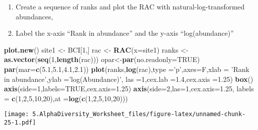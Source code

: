 \documentclass[
]{article}
\newenvironment{Shaded}{\begin{snugshade}}{\end{snugshade}}
\newcommand{\DataTypeTok}[1]{\textcolor[rgb]{0.13,0.29,0.53}{#1}}
\newcommand{\DecValTok}[1]{\textcolor[rgb]{0.00,0.00,0.81}{#1}}
\newcommand{\FloatTok}[1]{\textcolor[rgb]{0.00,0.00,0.81}{#1}}
\newcommand{\KeywordTok}[1]{\textcolor[rgb]{0.13,0.29,0.53}{\textbf{#1}}}
\newcommand{\NormalTok}[1]{#1}
\newcommand{\OtherTok}[1]{\textcolor[rgb]{0.56,0.35,0.01}{#1}}
\newcommand{\StringTok}[1]{\textcolor[rgb]{0.31,0.60,0.02}{#1}}
\begin{document}
\begin{enumerate}
\def\labelenumi{\arabic{enumi}.}
\item
  Create a sequence of ranks and plot the RAC with
  natural-log-transformed abundances,
\item
  Label the x-axis ``Rank in abundance'' and the y-axis
  ``log(abundance)''
\end{enumerate}

\begin{Shaded}
\begin{Highlighting}[]
\KeywordTok{plot.new}\NormalTok{()}
\NormalTok{site1 <-}\StringTok{ }\NormalTok{BCI[}\DecValTok{1}\NormalTok{,]}
\NormalTok{rac <-}\StringTok{ }\KeywordTok{RAC}\NormalTok{(}\DataTypeTok{x=}\NormalTok{site1)}
\NormalTok{ranks <-}\StringTok{ }\KeywordTok{as.vector}\NormalTok{(}\KeywordTok{seq}\NormalTok{(}\DecValTok{1}\NormalTok{,}\KeywordTok{length}\NormalTok{(rac)))}
\NormalTok{opar<-}\KeywordTok{par}\NormalTok{(}\DataTypeTok{no.readonly=}\OtherTok{TRUE}\NormalTok{)}
\KeywordTok{par}\NormalTok{(}\DataTypeTok{mar=}\KeywordTok{c}\NormalTok{(}\FloatTok{5.1}\NormalTok{,}\FloatTok{5.1}\NormalTok{,}\FloatTok{4.1}\NormalTok{,}\FloatTok{2.1}\NormalTok{))}
\KeywordTok{plot}\NormalTok{(ranks,}\KeywordTok{log}\NormalTok{(rac),}\DataTypeTok{type =}\StringTok{'p'}\NormalTok{,}\DataTypeTok{axes=}\NormalTok{F,}\DataTypeTok{xlab =} \StringTok{'Rank in abundance'}\NormalTok{,}\DataTypeTok{ylab =}\StringTok{'log(Abundance)'}\NormalTok{,}
     \DataTypeTok{las =}\DecValTok{1}\NormalTok{,}\DataTypeTok{cex.lab =}\FloatTok{1.4}\NormalTok{,}\DataTypeTok{cex.axis =}\FloatTok{1.25}\NormalTok{)}
\KeywordTok{box}\NormalTok{()}
\KeywordTok{axis}\NormalTok{(}\DataTypeTok{side=}\DecValTok{1}\NormalTok{,}\DataTypeTok{labels=}\OtherTok{TRUE}\NormalTok{,}\DataTypeTok{cex.axis=}\FloatTok{1.25}\NormalTok{)}
\KeywordTok{axis}\NormalTok{(}\DataTypeTok{side=}\DecValTok{2}\NormalTok{,}\DataTypeTok{las=}\DecValTok{1}\NormalTok{,}\DataTypeTok{cex.axis=}\FloatTok{1.25}\NormalTok{,}
     \DataTypeTok{labels =} \KeywordTok{c}\NormalTok{(}\DecValTok{1}\NormalTok{,}\DecValTok{2}\NormalTok{,}\DecValTok{5}\NormalTok{,}\DecValTok{10}\NormalTok{,}\DecValTok{20}\NormalTok{),}\DataTypeTok{at =}\KeywordTok{log}\NormalTok{(}\KeywordTok{c}\NormalTok{(}\DecValTok{1}\NormalTok{,}\DecValTok{2}\NormalTok{,}\DecValTok{5}\NormalTok{,}\DecValTok{10}\NormalTok{,}\DecValTok{20}\NormalTok{)))}
\end{Highlighting}
\end{Shaded}

\texttt{[image: 5.AlphaDiversity\_Worksheet\_files/figure-latex/unnamed-chunk-25-1.pdf]}
\end{document}
